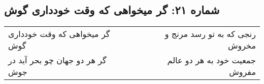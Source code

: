 \begin{center}
\section*{شماره ۲۱: گر میخواهی که وقت خودداری گوش}
\label{sec:021}
\begin{longtable}{l p{0.5cm} r}
گر میخواهی که وقت خودداری گوش
&&
رنجی که به تو رسد مرنج و مخروش
\\
گر هر دو جهان چو بحر آید در جوش
&&
جمعیت خود به هر دو عالم مفروش
\\
\end{longtable}
\end{center}
